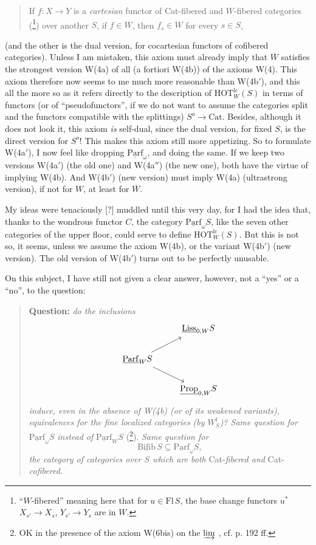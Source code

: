 \documentclass[11pt]{article}
\newcommand{\printedpage}[1]{\marginpar{\footnotesize p.~#1}}
\newcommand{\msp}[1]{\marginpar{\footnotesize [#1]}}
\newcommand{\Parf}{\underline{\mathrm{Parf}}}
\newcommand{\Liss}{\underline{\mathrm{Liss}}}
\newcommand{\Prop}{\underline{\mathrm{Prop}}}
\newcommand{\Bifib}{\underline{\mathrm{Bifib}}}
\newcommand{\HOT}{\mathrm{HOT}}
\begin{document}
\begin{quote}
If $f : X \longrightarrow Y$ is a \textit{cartesian} functor of Cat-fibered and $W$-fibered categories (\footnote{``$W$-fibered'' meaning here that for $u \in \mathrm{Fl}\,S$, the base change functors $u^*$ $X_{s'} \longrightarrow X_s$, $Y_{s'} \longrightarrow Y_s$ are in $W$.}) over another $S$, if $f \in W$, then $f_s \in W$ for every $s \in S$,
\end{quote}

(and the other is the dual version, for cocartesian functors of cofibered categories). Unless I am mistaken, this axiom must already imply that $\overline{W}$ satisfies the strongest version W(4a)
\printedpage{115}
of all (a fortiori W(4b)) of the axioms W(4). This axiom therefore now seems to me much more reasonable than W(4b$'$), and this all the more so as it refers directly to the description of $\HOT^{\mathrm{lc}}_W(S)$ in terms of functors (or of ``pseudofunctors'', if we do not want to assume the categories split and the functors compatible with the splittings) $S^{o} \longrightarrow \mathrm{Cat}$. %
Besides, although it does not look it, this axiom \textit{is} self-dual, since the dual version, for fixed $S$, is the direct version for $S^{o}$! This makes this axiom still more appetizing. So to formulate W(4a$'$), I now feel like dropping $\Parf_\omega$, and doing the same. If we keep two versions W(4a$'$) (the old one) and W(4a$''$) (the new one), both have the virtue of implying W(4b). And W(4b$'$) (new version) must imply W(4a) (ultrastrong version), if not for $W$, at least for $\overline{W}$.

My ideas were tenaciously [?] muddled
\msp{page 186}
until this very day, for I had the idea that, thanks to the wondrous functor $C$, the category $\Parf_\omega S$, like the seven other categories of the upper floor, could serve to define $\HOT^{\mathrm{lc}}_W(S)$. But this is not so, it seems, unless we assume the axiom W(4b), or the variant W(4b$'$) (new version). The old version of W(4b$'$) turns out to be perfectly unusable. %

On this subject, I have still not given a clear answer, however, not a ``yes'' or a ``no'', to the question:

\begin{quote}
\textbf{Question:} \textit{do the inclusions}
\[
\begin{tikzcd}
 & \Liss_{0,W}S \\
\Parf_W S \arrow[ur] \arrow[dr] & \\
 & \Prop_{0,W}S
\end{tikzcd}
\]
\textit{induce, even in the absence of W(4b) (or of its weakened variants), equivalences for the fine localized categories (by $W^{\mathrm{f}}_S$)? Same question for} $\Parf_\omega S$ \textit{instead of} $\Parf_W S$ (\footnote{OK in the presence of the axiom W(6bis) on the $\varinjlim$ , cf. p. 192 ff.}). \textit{Same question for}
\[ \Bifib\, S \subseteq \Parf_\omega S, \]
\textit{the category of categories over $S$ which are both} Cat-\textit{fibered and} Cat-\textit{cofibered.}
\end{quote}
\end{document}
